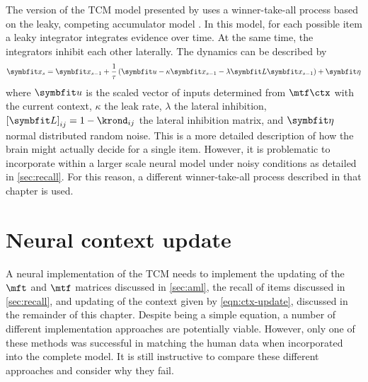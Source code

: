 The version of the TCM model presented by \textcite{Sederberg2008} uses a winner-take-all process based on the leaky, competing accumulator model \parencite{Usher2001}.
In this model, for each possible item a leaky integrator integrates evidence over time.
At the same time, the integrators inhibit each other laterally.
The dynamics can be described by
\begin{equation}
    \vc x_s = \vc x_{s - 1} + \frac{1}{\tau} \del{\vc u - \kappa \vc x_{s - 1} - \lambda \mat L \vc x_{s - 1}} + \vc\eta
\end{equation}
where $\vc u$ is the scaled vector of inputs determined from $\mtf \ctx$ with the current context, $\kappa$ the leak rate, $\lambda$ the lateral inhibition, ${[\mat L]}_{ij} = 1 - \krond_{ij}$ the lateral inhibition matrix, and $\vc\eta$ normal distributed random noise.
This is a more detailed description of how the brain might actually decide for a single item.
However, it is problematic to incorporate within a larger scale neural model under noisy conditions as detailed in \cref{sec:recall}.
For this reason, a different winner-take-all process described in that chapter is used.


\section{Neural context update}\label{sec:ctx-update}
A neural implementation of the TCM needs to implement the updating of the $\mft$ and $\mtf$ matrices discussed in \cref{sec:aml}, the recall of items discussed in \cref{sec:recall}, and updating of the context given by \cref{eqn:ctx-update}, discussed in the remainder of this chapter.
Despite being a simple equation, a number of different implementation approaches are potentially viable.
However, only one of these methods was successful in matching the human data when incorporated into the complete model.
It is still instructive to compare these different approaches and consider why they fail.

